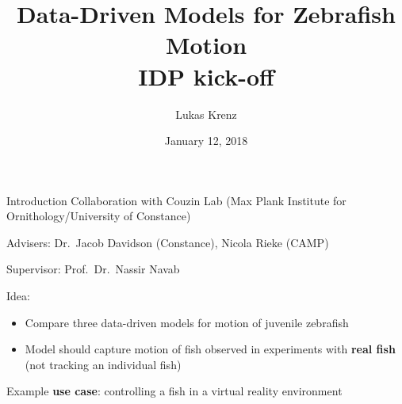 \documentclass{beamer}
\title{Data-Driven Models for Zebrafish Motion\\IDP kick-off}
\author{Lukas Krenz}
\date{January 12, 2018}
\institute{TUM, Chair for Computer Aided Medical Procedures \textit{\&} Augmented Reality}
\begin{document}
\maketitle
\begin{frame}{Introduction}
Collaboration with Couzin Lab (Max Plank Institute for Ornithology/University of Constance)

Advisers: Dr.\ Jacob Davidson (Constance), Nicola Rieke (CAMP)

Supervisor: Prof.\ Dr.\ Nassir Navab

Idea:
\begin{itemize}
\item Compare three data-driven models for motion of juvenile zebrafish
\item Model should capture motion of fish observed in experiments with \textbf{real fish} (\alert{not tracking} an individual fish)
\end{itemize}

Example \textbf{use case}: controlling a fish in a virtual reality environment
\end{frame}
\end{document}
